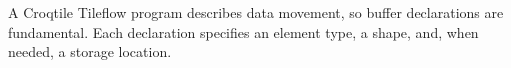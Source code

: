 A Croqtile Tileflow program describes data movement, so buffer declarations are fundamental. Each declaration specifies an element type, a shape, and, when needed, a storage location.
